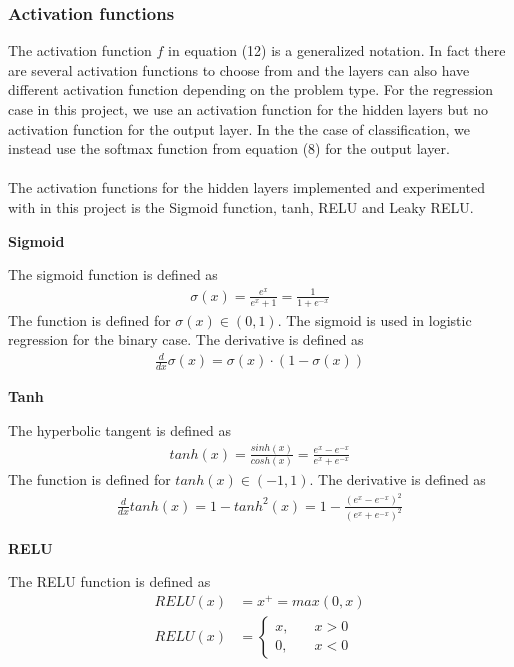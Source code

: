 \documentclass[a4paper,twocolumn]{article}
\begin{document}
\subsubsection{Activation functions}
The activation function $f$ in equation (12) is a generalized notation. In fact there are several activation functions to choose from and the layers can also have different activation function depending on the problem type. For the regression case in this project, we use an activation function for the hidden layers but no activation function for the output layer. In the the case of classification, we instead use the softmax function from equation (8) for the output layer.\\
\\
The activation functions for the hidden layers implemented and experimented with in this project is the Sigmoid function, tanh, RELU and Leaky RELU.
\begin{center}
    \textbf{Sigmoid}
\end{center}
The sigmoid function is defined as
\begin{align}
    \sigma(x) = \frac{e^{x}}{e^{x} + 1} = \frac{1}{1 + e^{-x}}
\end{align}
The function is defined for $\sigma(x) \in (0,1)$. The sigmoid is used in logistic regression for the binary case. The derivative is defined as
\begin{align}
    \frac{d}{dx}\sigma(x) = \sigma(x) \cdot (1 - \sigma(x))
\end{align}
\begin{center}
    \textbf{Tanh}
\end{center}
The hyperbolic tangent is defined as 
\begin{align}
    tanh(x) = \frac{sinh(x)}{cosh(x)} = \frac{e^{x} - e^{-x}}{e^{x} + e^{-x}}
\end{align}
The function is defined for $tanh(x) \in (-1, 1)$. The derivative is defined as
\begin{align}
    \frac{d}{dx}tanh(x) = 1 - tanh^{2}(x) = 1 - \frac{(e^{x} - e^{-x})^{2}}{(e^{x} + e^{-x})^{2}}
\end{align}
\begin{center}
    \textbf{RELU}
\end{center}
The RELU function is defined as 
\begin{align}
    RELU(x) &= x^{+} = max (0, x)\\
    RELU(x) &= \begin{cases} 
                    x, &\quad x > 0\\
                    0, &\quad x < 0
                \end{cases}
\end{align}
\end{document}
